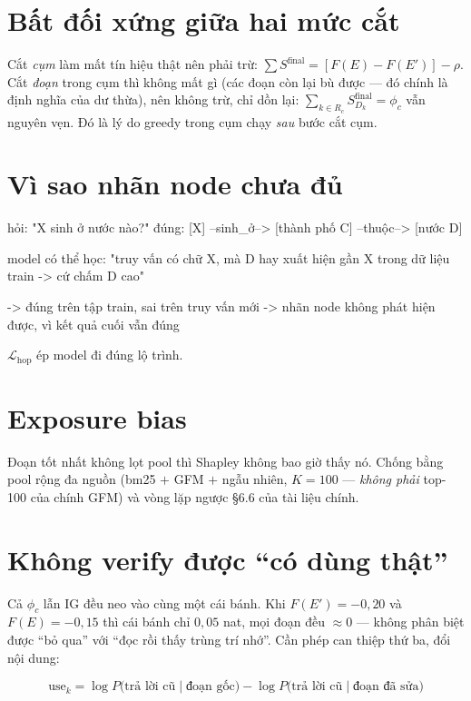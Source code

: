 \documentclass[11pt,a4paper]{article}
\begin{document}
\section{Bất đối xứng giữa hai mức cắt}

Cắt \emph{cụm} làm mất tín hiệu thật nên phải trừ: $\sum S^{\text{final}}=[F(E)-F(E')]-\rho$. Cắt \emph{đoạn} trong cụm thì không mất gì (các đoạn còn lại bù được --- đó chính là định nghĩa của dư thừa), nên không trừ, chỉ dồn lại: $\sum_{k\in R_c}S^{\text{final}}_{D_k}=\phi_c$ vẫn nguyên vẹn. Đó là lý do greedy trong cụm chạy \emph{sau} bước cắt cụm.

\section{Vì sao nhãn node chưa đủ}
\label{sec:nhannode}

\begin{dia}
hỏi:  "X sinh ở nước nào?"
đúng: [X] --sinh_ở--> [thành phố C] --thuộc--> [nước D]

model có thể học:  "truy vấn có chữ X, mà D hay xuất hiện gần X
                    trong dữ liệu train -> cứ chấm D cao"

-> đúng trên tập train, sai trên truy vấn mới
-> nhãn node không phát hiện được, vì kết quả cuối vẫn đúng
\end{dia}

$\mathcal{L}_{\text{hop}}$ ép model đi đúng lộ trình.

\section{Exposure bias}

Đoạn tốt nhất không lọt pool thì Shapley không bao giờ thấy nó. Chống bằng pool rộng đa nguồn (bm25 $+$ GFM $+$ ngẫu nhiên, $K=100$ --- \emph{không phải} top-100 của chính GFM) và vòng lặp ngược \S6.6 của tài liệu chính.

\section{Không verify được ``có dùng thật''}

Cả $\phi_c$ lẫn IG đều neo vào cùng một cái bánh. Khi $F(E')=-0{,}20$ và $F(E)=-0{,}15$ thì cái bánh chỉ $0{,}05$ nat, mọi đoạn đều $\approx 0$ --- không phân biệt được ``bỏ qua'' với ``đọc rồi thấy trùng trí nhớ''. Cần phép can thiệp thứ ba, đổi nội dung:

\[
\mathrm{use}_k=\log P\big(\text{trả lời cũ}\mid\text{đoạn gốc}\big)
-\log P\big(\text{trả lời cũ}\mid\text{đoạn đã sửa}\big)
\]
\end{document}
